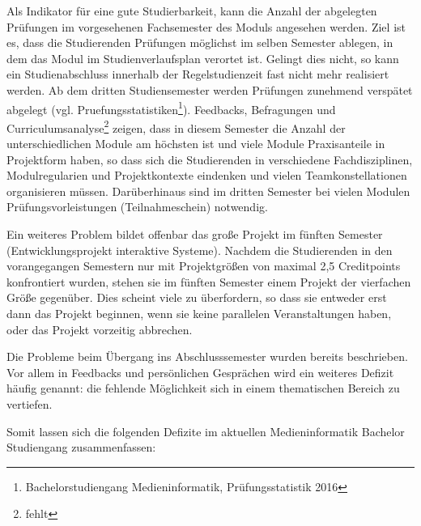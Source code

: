Als Indikator für eine gute Studierbarkeit, kann die Anzahl der
abgelegten Prüfungen im vorgesehenen Fachsemester des Moduls angesehen
werden. Ziel ist es, dass die Studierenden Prüfungen möglichst im selben
Semester ablegen, in dem das Modul im Studienverlaufsplan verortet ist.
Gelingt dies nicht, so kann ein Studienabschluss innerhalb der
Regelstudienzeit fast nicht mehr realisiert werden. Ab dem dritten
Studiensemester werden Prüfungen zunehmend verspätet abgelegt (vgl.
Pruefungsstatistiken\footnote{Bachelorstudiengang Medieninformatik,
  Prüfungsstatistik 2016}). Feedbacks, Befragungen und
Curriculumsanalyse\footnote{fehlt} zeigen, dass in diesem Semester die
Anzahl der unterschiedlichen Module am höchsten ist und viele Module
Praxisanteile in Projektform haben, so dass sich die Studierenden in
verschiedene Fachdisziplinen, Modulregularien und Projektkontexte
eindenken und vielen Teamkonstellationen organisieren müssen.
Darüberhinaus sind im dritten Semester bei vielen Modulen
Prüfungsvorleistungen (Teilnahmeschein) notwendig.

Ein weiteres Problem bildet offenbar das große Projekt im fünften
Semester (Entwicklungsprojekt interaktive Systeme). Nachdem die
Studierenden in den vorangegangen Semestern nur mit Projektgrößen von
maximal 2,5 Creditpoints konfrontiert wurden, stehen sie im fünften
Semester einem Projekt der vierfachen Größe gegenüber. Dies scheint
viele zu überfordern, so dass sie entweder erst dann das Projekt
beginnen, wenn sie keine parallelen Veranstaltungen haben, oder das
Projekt vorzeitig abbrechen.

Die Probleme beim Übergang ins Abschlusssemester wurden bereits
beschrieben. Vor allem in Feedbacks und persönlichen Gesprächen wird ein
weiteres Defizit häufig genannt: die fehlende Möglichkeit sich in einem
thematischen Bereich zu vertiefen.

Somit lassen sich die folgenden Defizite im aktuellen Medieninformatik
Bachelor Studiengang zusammenfassen:

